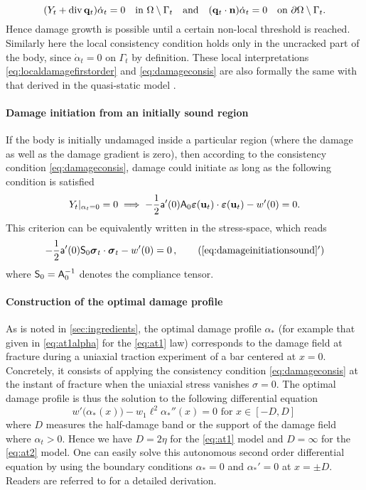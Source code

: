 \begin{equation} \label{eq:damageconsis}
(Y_t+\div\vec{q}_t)\dot{\alpha}_t=0\quad\text{in }\domaint\quad\text{and}\quad(\vec{q}_t\cdot\vec{n})\dot{\alpha}_t=0\quad\text{on }\partial\Omega\setminus\Gamma_t.
\end{equation}
Hence damage growth is possible until a certain non-local threshold is reached. Similarly here the local consistency condition holds only in the uncracked part of the body, since $\dot{\alpha}_t=0$ on $\Gamma_t$ by definition. These local interpretations \eqref{eq:localdamagefirstorder} and \eqref{eq:damageconsis} are also formally the same with that derived in the quasi-static model \cite{PhamMarigo:2010-1,SicsicMarigo:2013}.

\paragraph{Damage initiation from an initially sound region}
If the body is initially undamaged inside a particular region (where the damage as well as the damage gradient is zero), then according to the consistency condition \eqref{eq:damageconsis}, damage could initiate as long as the following condition is satisfied
\begin{equation} \label{eq:damageinitiationsound}
Y_t|_{\alpha_t=0}=0\implies -\frac{1}{2}\mathsf{a}'(0)\tens{A}_0\eps(\vec{u}_t)\cdot\eps(\vec{u}_t)-w'(0)=0.
\end{equation}
This criterion can be equivalently written in the stress-space, which reads
\begin{align} \label{eq:damageinitiationsound2}
-\frac{1}{2}\mathsf{a}'(0)\tens{S}_0\sig_t\cdot\sig_t-w'(0)=0\,, \tag{\ref*{eq:damageinitiationsound}${}^\prime$}
\end{align}
where $\mathsf{S}_0=\mathsf{A}_0^{-1}$ denotes the compliance tensor.

\paragraph{Construction of the optimal damage profile}
As is noted in \cref{sec:ingredients}, the optimal damage profile $\alpha_*$ (for example that given in \eqref{eq:at1alpha} for the \eqref{eq:at1} law) corresponds to the damage field at fracture during a uniaxial traction experiment of a bar centered at $x=0$. Concretely, it consists of applying the consistency condition \eqref{eq:damageconsis} at the instant of fracture when the uniaxial stress vanishes $\sigma=0$. The optimal damage profile is thus the solution to the following differential equation
\begin{equation} \label{eq:defoptimaldamage}
w'\bigl(\alpha_*(x)\bigr)-w_1\ell^2\alpha_*''(x)=0\text{ for $x\in[-D,D]$}\,
\end{equation}
where $D$ measures the half-damage band or the support of the damage field where $\alpha_t> 0$. Hence we have $D=2\eta$ for the \eqref{eq:at1} model and $D=\infty$ for the \eqref{eq:at2} model. One can easily solve this autonomous second order differential equation by using the boundary conditions $\alpha_*=0$ and $\alpha_*'=0$ at $x=\pm D$. Readers are referred to \cite{PhamAmorMarigoMaurini:2011} for a detailed derivation.

